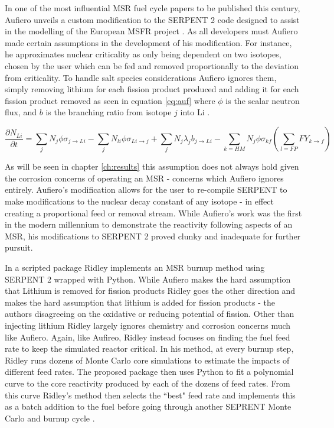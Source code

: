 In one of the most influential MSR fuel cycle papers to be published this
century, Aufiero unveils a custom modification to the SERPENT 2 code designed to
assist in the modelling of the European MSFR project \cite{Aufiero}. As all
developers must Aufiero made certain assumptions in the development of his
modification. For instance, he
 approximates nuclear criticality as only being dependent 
on two isotopes, chosen by the user which can be fed and removed proportionally
to the deviation from criticality. To handle salt species considerations Aufiero
ignores them, simply removing lithium for each fission product produced and
adding it for each fission product removed as seen in equation \ref{eq:auf} 
where $\phi$ is the scalar neutron flux, and $b$ is the branching ratio
from isotope $j$ into Li \cite{Aufiero}. 

\begin{equation} \label{eq:auf}
\frac{\partial N_{Li}}{\partial t} = \sum_{j} N_{j} \phi \sigma_{j \rightarrow
    Li} - \sum_{j} N_{li} \phi \sigma_{Li \rightarrow j} + \sum_{j} N_{j}
    \lambda_{j} b_{j \rightarrow Li} - \sum_{k = HM} N_{j} \phi \sigma_{kf}
    \left ( \sum_{l=FP}FY_{k \rightarrow f} \right )
\end{equation}

As will be seen in chapter \ref{ch:results} this assumption does not always hold
given the corrosion concerns of operating an MSR - concerns which Aufiero ignores
entirely. Aufiero's modification allows for the user to re-compile SERPENT to
make modifications to the nuclear decay constant of any isotope - in effect 
creating a proportional feed or removal stream. While Aufiero's work was the
first in the modern millennium to demonstrate the reactivity following aspects
of an MSR, his modifications to SERPENT 2 proved clunky and inadequate for
further pursuit.

In a scripted package Ridley implements an MSR burnup method using SERPENT 2
wrapped with Python. While Aufiero makes the hard assumption that Lithium is
removed for fission products Ridley goes the other direction and makes the
hard assumption that lithium is added for fission products - the authors
disagreeing on the oxidative or reducing potential of fission. Other than
injecting lithium Ridley largely ignores chemistry and corrosion concerns much
like Aufiero. Again, like Aufireo, Ridley instead focuses on finding the fuel
feed rate to keep the simulated reactor critical. In his method, at every
burnup step, Ridley runs dozens of Monte Carlo core simulations to estimate
the impacts of different feed rates. The proposed package then uses Python to
fit a polynomial curve to the core reactivity produced by each of the dozens
of feed rates. From this curve Ridley's method then selects the ``best" feed
rate and implements this as a batch addition to the fuel before going through
another SEPRENT Monte Carlo and burnup cycle \cite{Ridley}. 

